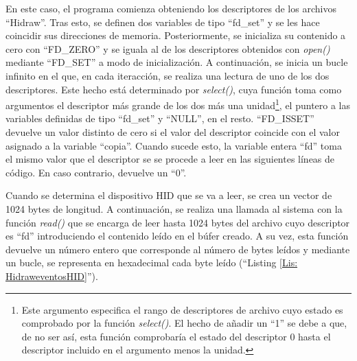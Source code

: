 En este caso, el programa comienza obteniendo los descriptores de los archivos ``Hidraw''. Tras esto, se definen dos variables de tipo ``fd\_set'' y se les hace coincidir sus direcciones de memoria. Posteriormente, se inicializa su contenido a cero con ``FD\_ZERO'' y se iguala al de los descriptores obtenidos con {\itshape open()} mediante ``FD\_SET'' a modo de inicialización. A continuación, se inicia un bucle infinito en el que, en cada iteracción, se realiza una lectura de uno de los dos descriptores. Este hecho está determinado por {\itshape select()}, cuya función toma como argumentos el descriptor más grande de los dos más una unidad\footnote{Este argumento especifica el rango de descriptores de archivo cuyo estado es comprobado por la función {\itshape select()}. El hecho de añadir un ``1'' se debe a que, de no ser así, esta función comprobaría el estado del descriptor 0 hasta el descriptor incluido en el argumento menos la unidad.}, el puntero a las variables definidas de tipo ``fd\_set'' y ``NULL'', en el resto. ``FD\_ISSET'' devuelve un valor distinto de cero si el valor del descriptor coincide con el valor asignado a la variable ``copia''. Cuando sucede esto, la variable entera ``fd'' toma el mismo valor que el descriptor se se procede a leer en las siguientes líneas de código. En caso contrario, devuelve un ``0''. 

Cuando se determina el dispositivo HID que se va a leer, se crea un vector de 1024 bytes de longitud. A continuación, se realiza una llamada al sistema con la función {\itshape read()} que se encarga de leer hasta 1024 bytes del archivo cuyo descriptor es ``fd'' introduciendo el contenido leído en el búfer creado. A su vez, esta función devuelve un número entero que corresponde al número de bytes leídos y mediante un bucle, se representa en hexadecimal cada byte leído (``Listing \ref{Lis: HidraweventosHID}'').


